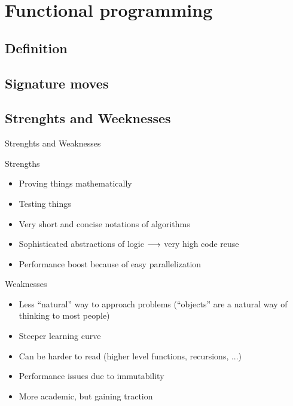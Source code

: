 \section{Functional programming}

\subsection{Definition}

\subsection{Signature moves}

\subsection{Strenghts and Weeknesses}

\begin{frame}{Strenghts and Weaknesses}
\begin{block}{Strengths}
	\begin{itemize}
		\item Proving things mathematically
		\item Testing things
		\item Very short and concise notations of algorithms
		\item Sophisticated abstractions of logic $\longrightarrow$ very high code reuse
		\item Performance boost because of easy parallelization
	\end{itemize}
\end{block}

\begin{block}{Weaknesses}
	\begin{itemize}
		\item Less \enquote{natural} way to approach problems (\enquote{objects} are a natural way of thinking to most people)
		\item Steeper learning curve
		\item Can be harder to read (higher level functions, recursions, ...)
		\item Performance issues due to immutability
		\item More academic, but gaining traction 
	\end{itemize}
\end{block}

\end{frame}